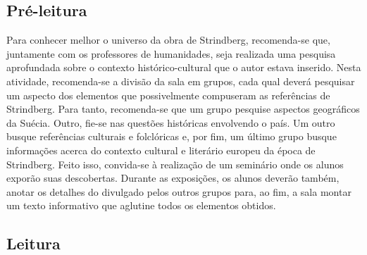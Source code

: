 \documentclass[12pt]{extarticle}
\begin{document}
\subsection{Pré-leitura}

Para conhecer melhor o universo da obra de Strindberg,
recomenda-se que, juntamente com os professores de humanidades, seja
realizada uma pesquisa aprofundada sobre o contexto histórico-cultural
que o autor estava inserido. Nesta atividade, recomenda-se a divisão da
sala em grupos, cada qual deverá pesquisar um aspecto dos elementos que
possivelmente compuseram as referências de Strindberg. Para tanto,
recomenda-se que um grupo pesquise aspectos geográficos da Suécia.
Outro, fie-se nas questões históricas envolvendo o país. Um outro busque
referências culturais e folclóricas e, por fim, um último grupo busque
informações acerca do contexto cultural e literário europeu da época de
Strindberg. Feito isso, convida-se à realização de um seminário onde os
alunos exporão suas descobertas. Durante as exposições, os alunos
deverão também, anotar os detalhes do divulgado pelos outros grupos
para, ao fim, a sala montar um texto informativo que aglutine todos os
elementos obtidos.




\subsection{Leitura}

\end{document}
